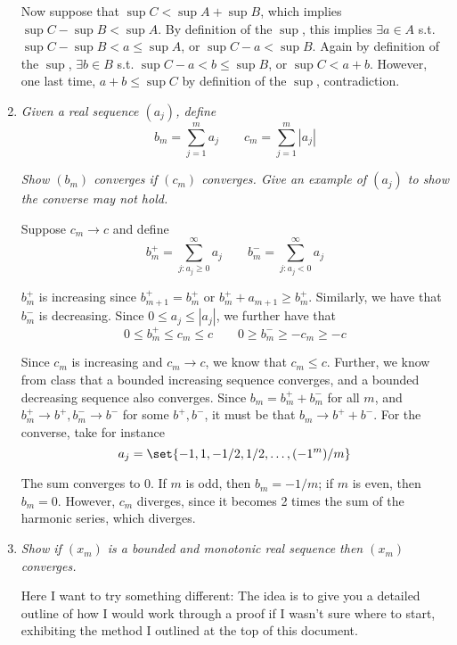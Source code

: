 \documentclass{article}
\begin{document}
\begin{enumerate}[1.]
      Now suppose that $\sup C < \sup A + \sup B$, which implies $\sup C - \sup B < \sup A$. By definition of the $\sup$, this implies $\exists a \in A$ s.t. $\sup C - \sup B < a \le \sup A$, or $\sup C - a < \sup B$. Again by definition of the $\sup$, $\exists b \in B$ s.t. $\sup C - a < b \le \sup B$, or $\sup C < a + b$. However, one last time, $a + b \le \sup C$ by definition of the $\sup$, contradiction.

  \item \textit{Given a real sequence $(a_j)$, define}
    \[
        b_m = \sum^{m}_{j = 1} a_j
        \quad\quad
        c_m = \sum^{m}_{j = 1} |a_j|
    \]

    \textit{Show $(b_m)$ converges if $(c_m)$ converges. Give an example of $(a_j)$ to show the converse may not hold.}

      \solution Suppose $c_m \to c$ and define 
      \[
          b_m^+ = \sum^{\infty}_{j: a_j \ge 0} a_j
          \quad\quad
          b_m^- = \sum^{\infty}_{j: a_j < 0} a_j
      \]

      $b_m^+$ is increasing since $b_{m + 1}^+ = b_m^+$ or $b_m^+ + a_{m +1} \ge b_m^+$. Similarly, we have that $b_m^-$ is decreasing. Since $0 \le a_j \le |a_j|$, we further have that
      \[
          0 \le b_m^+ \le c_m \le c
          \quad\quad
          0 \ge b_m^- \ge -c_m \ge -c
      \]

      Since $c_m$ is increasing and $c_m \to c$, we know that $c_m \le c$. Further, we know from class that a bounded increasing sequence converges, and a bounded decreasing sequence also converges. Since $b_m = b_m^+ + b_m^-$ for all $m$, and $b_m^+ \to b^+, b_m^- \to b^-$ for some $b^+, b^-$, it must be that $b_m \to b^+ + b^-$. For the converse, take for instance
      \[
          a_j = \set{-1, 1, -1 / 2, 1 / 2, \ldots, (-1^m) / m}
      \]

      The sum converges to 0. If $m$ is odd, then $b_m = -1 / m$; if $m$ is even, then $b_m = 0$. However, $c_m$ diverges, since it becomes 2 times the sum of the harmonic series, which diverges.

  \item \textit{Show if $(x_m)$ is a bounded and monotonic real sequence then $(x_m)$ converges.}

    \solution Here I want to try something different: The idea is to give you a detailed outline of how I would work through a proof if I wasn't sure where to start, exhibiting the method I outlined at the top of this document.


\end{enumerate}
\end{document}
